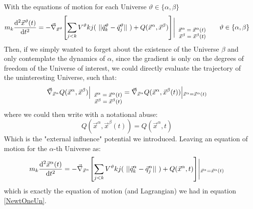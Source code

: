 \documentclass[11pt, a4paper]{article} %
\begin{document}
{With the equations of motion for each Universe $\vartheta\in\{\alpha, \beta\}$
\begin{equation}
m_k \dv[2]{\vec{x}^\vartheta(t)}{t} = -\vec{\nabla}_{\vec{x}^\vartheta}\qty[\sum_{j< k} V^\vartheta{kj}(\ ||\vec{q}^\vartheta_k-\vec{q}^\vartheta_j||\ )+ Q(\vec{x}^\alpha, \vec{x}^\beta)]{\Bigg\rvert}\null_{  \footnotesize    \begin{array}{r@{}}
\vec{x}^\alpha=\vec{x}^\alpha(t)\\\vec{x}^\beta=\vec{x}^\beta(t) \end{array}}\quad\quad \vartheta\in\{\alpha, \beta\}
\end{equation}
Then, if we simply wanted to forget about the existence of the Universe $\beta$ and only contemplate the dynamics of $\alpha$, since the gradient is only on the degrees of freedom of the Universe of interest, we could directly evaluate the trajectory of the uninteresting Universe, such that:
\begin{equation}\label{trick1}
\vec{\nabla}_{\vec{x}^\alpha}Q(\vec{x}^\alpha, \vec{x}^\beta){\Big\rvert}\null_{  \footnotesize    \begin{array}{r@{}}
\vec{x}^\alpha=\vec{x}^\alpha(t)\\\vec{x}^\beta=\vec{x}^\beta(t) \end{array}}=\vec{\nabla}_{\vec{x}^\alpha}Q(\vec{x}^\alpha, \vec{x}^\beta(t)){\Big\rvert}\null_{ \vec{x}^\alpha=\vec{x}^\alpha(t) }
\end{equation}
where we could then write with a notational abuse:
\begin{equation}\label{trick2}
Q(\vec{x}^\alpha, \vec{x}^\beta(t))=Q(\vec{x}^\alpha, t)
\end{equation}
Which is the "external influence" potential we introduced. Leaving an equation of motion for the $\alpha$-th Universe as:
\begin{equation}
m_k \dv[2]{\vec{x}^\alpha(t)}{t} = -\vec{\nabla}_{\vec{x}^\alpha}\qty[\sum_{j< k} V^\vartheta{kj}(\ ||\vec{q}^\alpha_k-\vec{q}^\alpha_j||\ )+ Q(\vec{x}^\alpha,t)]{\Bigg\rvert}\null_{
\vec{x}^\alpha=\vec{x}^\alpha(t)}
\end{equation}
which is exactly the equation of motion (and Lagrangian) we had in equation \eqref{NewtOneUn}.\\

}
\end{document}
